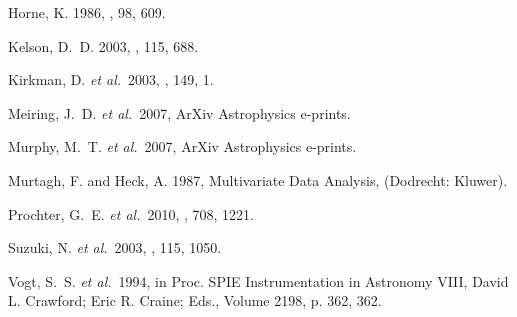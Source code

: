 \documentclass[]{emulateapj}
\begin{document}
\begin{thebibliography}{}
{Horne}, K. 1986, \pasp, 98, 609.

{Kelson}, D.~D. 2003, \pasp, 115, 688.

{Kirkman}, D. {\it et al.}\  2003, \apjs, 149, 1.

{Meiring}, J.~D. {\it et al.}\  2007, ArXiv Astrophysics e-prints.

{Murphy}, M.~T. {\it et al.}\  2007, ArXiv Astrophysics e-prints.

{Murtagh}, F. and {Heck}, A. 1987, { {Multivariate Data Analysis}}, (Dodrecht:
  Kluwer).

{Prochter}, G.~E. {\it et al.}\  2010, \apj, 708, 1221.

{Suzuki}, N. {\it et al.}\  2003, \pasp, 115, 1050.

{Vogt}, S.~S. {\it et al.}\  1994, in { Proc. SPIE Instrumentation in Astronomy
  VIII, David L. Crawford; Eric R. Craine; Eds., Volume 2198, p. 362}, 362.

\end{thebibliography}




\clearpage 
\end{document}
